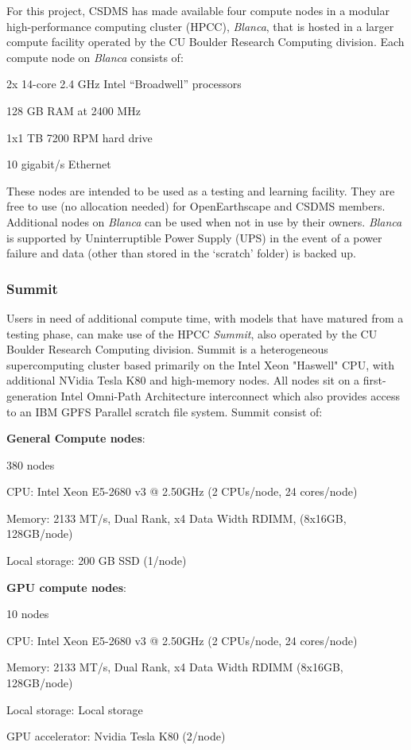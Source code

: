 For this project, CSDMS has made available four compute nodes in a modular high-performance computing cluster (HPCC), \textit{Blanca}, that is hosted in a larger compute facility operated by the CU Boulder Research Computing division. Each compute node on \textit{Blanca} consists of:
\begin{compactitem}
\item 2x 14-core 2.4 GHz Intel “Broadwell” processors
\item 128 GB RAM at 2400 MHz
\item 1x1 TB 7200 RPM hard drive
\item 10 gigabit/s Ethernet
\end{compactitem}
These nodes are intended to be used as a testing and learning facility. They are free to use (no allocation needed) for OpenEarthscape and CSDMS members. Additional nodes on \textit{Blanca} can be used when not in use by their owners. \textit{Blanca} is supported by Uninterruptible Power Supply (UPS) in the event of a power failure and data (other than stored in the `scratch' folder) is backed up.

\subsubsection*{Summit}

Users in need of additional compute time, with models that have matured from a testing phase, can make use of the HPCC \textit{Summit}, also operated by the CU Boulder Research Computing division.
Summit is a heterogeneous supercomputing cluster based primarily on the Intel Xeon "Haswell" CPU, with additional NVidia Tesla K80 and high-memory nodes. All nodes sit on a first-generation Intel Omni-Path Architecture interconnect which also provides access to an IBM GPFS Parallel scratch file system. Summit consist of:

\noindent
\textbf{General Compute nodes}:
\begin{compactitem}
\item 380 nodes
\item CPU: Intel Xeon E5-2680 v3 @ 2.50GHz (2 CPUs/node, 24 cores/node)
\item Memory: 2133 MT/s, Dual Rank, x4 Data Width RDIMM, (8x16GB, 128GB/node)
\item Local storage: 200 GB SSD (1/node)
\end{compactitem}

\noindent
\textbf{GPU compute nodes}:
\begin{compactitem}
\item 10 nodes
\item CPU: Intel Xeon E5-2680 v3 @ 2.50GHz (2 CPUs/node, 24 cores/node)
\item Memory: 2133 MT/s, Dual Rank, x4 Data Width RDIMM (8x16GB, 128GB/node)
\item Local storage: Local storage
\item GPU accelerator: Nvidia Tesla K80 (2/node)
\end{compactitem}

